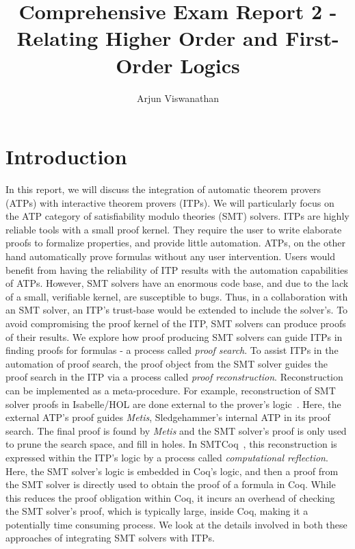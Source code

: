 \documentclass{article}
\begin{document}
	\title{Comprehensive Exam Report 2 - Relating Higher Order and First-Order Logics}
	\author{Arjun Viswanathan}
	\date{}
	\maketitle
	
	\section{Introduction}
	\label{sec:intro}
	In this report, we will discuss the 
	integration of automatic theorem provers 
	(ATPs) with interactive theorem 
	provers (ITPs). We will particularly
	focus on the ATP category of 
	satisfiability modulo theories (SMT) 
	solvers. ITPs are highly 
	reliable tools with a small proof kernel. 
	They require the user to write elaborate 
	proofs to formalize properties, and 
	provide little automation. ATPs, on the 
	other hand automatically prove formulas
	without any user intervention.  
	Users would benefit from having 
	the reliability of ITP results 
	with the automation capabilities
	of ATPs. However, SMT solvers have an 
	enormous code base, and due to the 
	lack of a small, verifiable kernel, 
	are susceptible to bugs. Thus, in a 
	collaboration with an SMT 
	solver, an ITP's trust-base would be 
	extended to include the solver's. To 
	avoid compromising the proof kernel of 
	the ITP, SMT solvers can 
	produce proofs of their results. 
	We explore how proof producing 
	SMT solvers can guide ITPs in 
	finding proofs for formulas - 
	a process called \textit{proof 
	search}. To assist ITPs in the 
	automation
	of proof search, the proof object from 
	the SMT solver guides the proof search 
	in the ITP via a process called
	\textit{proof reconstruction}.
	Reconstruction can be implemented 
	as a meta-procedure. For example, 
	reconstruction of SMT solver proofs 
	in Isabelle/HOL are done external to 
	the prover's logic~\cite{bohme}.
	Here, the external ATP's proof guides 
	\textit{Metis}, Sledgehammer's
	internal ATP in its proof search.
	The final proof is found by 
	\textit{Metis} and the SMT solver's 
	proof is only used to prune the 
	search space, and fill in holes.
	In SMTCoq~\cite{DBLP:phd/hal/Keller13},
	this reconstruction is 
	expressed within the ITP's logic 
	by a process called 
	\textit{computational reflection}.
	Here, the SMT solver's logic is 
	embedded in Coq's logic, and then 
	a proof from the SMT solver is 
	directly used to obtain the 
	proof of a formula in Coq. 
	While this reduces the 
	proof obligation within Coq, it incurs
	an overhead of checking the SMT 
	solver's proof, which is typically 
	large, inside Coq, making it a
	potentially time consuming process. 
	We look at the details involved in both 
	these approaches of integrating 
	SMT solvers with ITPs.
	
\end{document}
